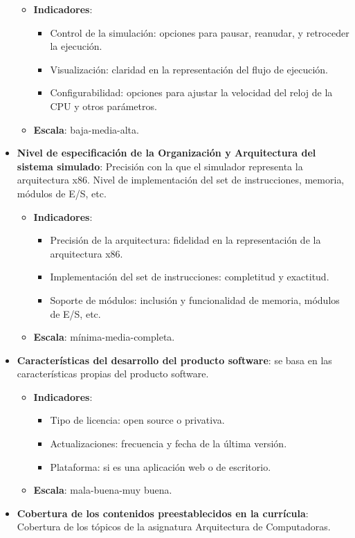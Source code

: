\documentclass[12pt,twoside]{templates/unerthesis}
\providecommand{\tightlist}{%
  \setlength{\itemsep}{0pt}\setlength{\parskip}{0pt}}
\begin{document}
\begin{itemize}
  \begin{itemize}
  \tightlist
  \item
    \textbf{Indicadores}:

    \begin{itemize}
    \tightlist
    \item
      Control de la simulación: opciones para pausar, reanudar, y retroceder la ejecución.
    \item
      Visualización: claridad en la representación del flujo de ejecución.
    \item
      Configurabilidad: opciones para ajustar la velocidad del reloj de la CPU y otros parámetros.
    \end{itemize}
  \item
    \textbf{Escala}: baja-media-alta.
  \end{itemize}
\item
  \textbf{Nivel de especificación de la Organización y Arquitectura del sistema simulado}: Precisión con la que el simulador representa la arquitectura x86. Nivel de implementación del set de instrucciones, memoria, módulos de E/S, etc.

  \begin{itemize}
  \tightlist
  \item
    \textbf{Indicadores}:

    \begin{itemize}
    \tightlist
    \item
      Precisión de la arquitectura: fidelidad en la representación de la arquitectura x86.
    \item
      Implementación del set de instrucciones: completitud y exactitud.
    \item
      Soporte de módulos: inclusión y funcionalidad de memoria, módulos de E/S, etc.
    \end{itemize}
  \item
    \textbf{Escala}: mínima-media-completa.
  \end{itemize}
\item
  \textbf{Características del desarrollo del producto software}: se basa en las características propias del producto software.

  \begin{itemize}
  \tightlist
  \item
    \textbf{Indicadores}:

    \begin{itemize}
    \tightlist
    \item
      Tipo de licencia: open source o privativa.
    \item
      Actualizaciones: frecuencia y fecha de la última versión.
    \item
      Plataforma: si es una aplicación web o de escritorio.
    \end{itemize}
  \item
    \textbf{Escala}: mala-buena-muy buena.
  \end{itemize}
\item
  \textbf{Cobertura de los contenidos preestablecidos en la currícula}: Cobertura de los tópicos de la asignatura Arquitectura de Computadoras.


\end{itemize}
\end{document}
